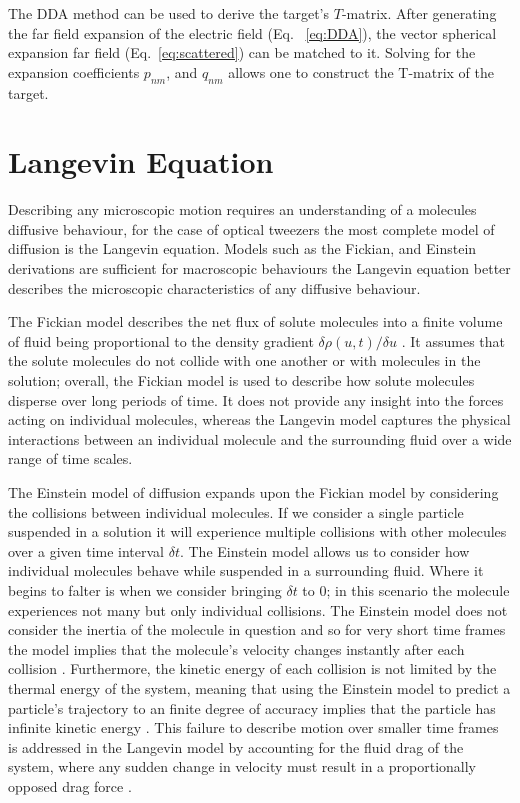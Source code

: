 The DDA method can be used to derive the target's $T$-matrix. After
generating the far field expansion of the electric field (Eq.~
\eqref{eq:DDA}), the vector spherical expansion far field 
(Eq.~\eqref{eq:scattered}) can be matched to it. Solving for the 
expansion coefficients $p_{nm}$, and $q_{nm}$ allows one to construct
the T-matrix of the target. 

\section{Langevin Equation}
Describing any microscopic motion requires an understanding of a 
molecules diffusive behaviour, for the case of optical tweezers 
the most complete model of diffusion is the Langevin equation. 
Models such as the Fickian, and Einstein derivations are sufficient 
for macroscopic behaviours the Langevin equation better describes 
the microscopic characteristics of any diffusive behaviour.
 
The Fickian model describes the net flux of solute molecules into a 
finite volume of fluid being proportional to the density gradient 
$\delta\rho(u,t)/\delta u$ \cite{Gillespie2012}. It assumes that the 
solute molecules do not collide with one another or with molecules in 
the solution; overall, the Fickian model is used to describe how solute 
molecules disperse over long periods of time. It does not provide any 
insight into the forces acting on individual molecules, whereas the 
Langevin model captures the physical interactions between an individual 
molecule and the surrounding fluid over a wide range of time scales.

The Einstein model of diffusion expands upon the Fickian model by 
considering the collisions between individual molecules. If we 
consider a single particle suspended in a solution it will experience 
multiple collisions with other molecules \cite{Gillespie2012a} over a 
given time interval $\delta t$. The Einstein model allows us to 
consider how individual molecules behave while suspended in a 
surrounding fluid. Where it begins to falter is when we consider 
bringing $\delta t$ to $0$; in this scenario the molecule experiences 
not many but only individual collisions. The Einstein model does not 
consider the inertia of the molecule in question and so for very short 
time frames the model implies that the molecule's velocity changes 
instantly after each collision \cite{Gillespie2012a,Gillespie2012b}. 
Furthermore, the kinetic energy of each collision is not limited by 
the thermal energy of the system, meaning that using the Einstein model 
to predict a particle's trajectory to an finite degree of accuracy 
implies that the particle has infinite kinetic energy \cite{Gillespie2012b}. 
This failure to describe motion over smaller time frames is addressed 
in the Langevin model by accounting for the fluid drag of the system, 
where any sudden change in velocity must result in a proportionally 
opposed drag force \cite{Gillespie2012c}. 

